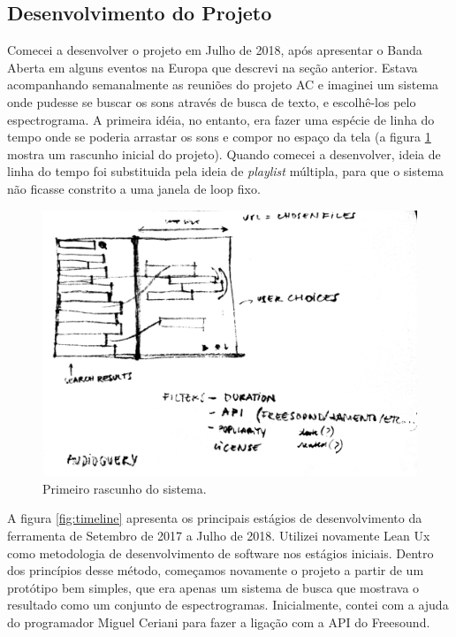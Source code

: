 \subsection{Desenvolvimento do Projeto}

Comecei a desenvolver o projeto em Julho de 2018, após apresentar o Banda Aberta em alguns eventos na Europa que descrevi na seção anterior. Estava acompanhando semanalmente as reuniões do projeto AC e imaginei um sistema onde pudesse se buscar os sons através de busca de texto, e escolhê-los pelo espectrograma. A primeira idéia, no entanto, era fazer uma espécie de linha do tempo onde se poderia arrastar os sons e compor no espaço da tela (a figura \ref{fig:firstsketch} mostra um rascunho inicial do projeto). Quando comecei a desenvolver, ideia de linha do tempo foi substituida pela ideia de \emph{playlist} múltipla, para que o sistema não ficasse constrito a uma janela de loop fixo. 

\begin{figure}
\includegraphics[width=1\textwidth]{pictures/cap4/firstsketch}
\caption{\label{firstsketch}Primeiro rascunho do sistema.}
\label{fig:firstsketch}
\end{figure}


A figura \ref{fig:timeline} apresenta os principais estágios de desenvolvimento da ferramenta de Setembro de 2017 a Julho de 2018. Utilizei novamente Lean Ux \cite{Liikkanen2014} como metodologia de desenvolvimento de software nos estágios iniciais. Dentro dos princípios desse método, começamos novamente o projeto a partir de um protótipo bem simples, que era apenas um sistema de busca que mostrava o resultado como um conjunto de espectrogramas. Inicialmente, contei com a ajuda do programador Miguel Ceriani para fazer a ligação com a API do Freesound.

